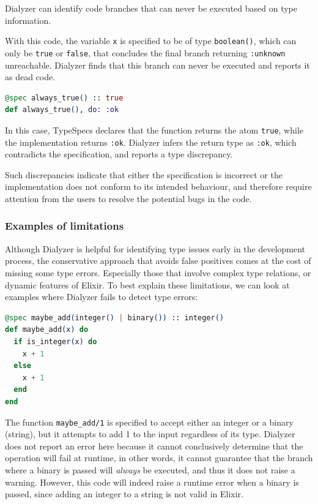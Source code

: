Dialyzer can identify code branches that can never be executed based on type information.

With this code, the variable \texttt{x} is specified to be of type \texttt{boolean()}, which can only be \texttt{true} or \texttt{false}, that concludes the final branch returning \texttt{:unknown} unreachable. 
Dialyzer finds that this branch can never be executed and reports it as dead code.

\begin{lstlisting}[language=Elixir, firstnumber=last]
@spec always_true() :: true
def always_true(), do: :ok
\end{lstlisting}

In this case, TypeSpecs declares that the function returns the atom \texttt{true}, while the implementation returns \texttt{:ok}. 
Dialyzer infers the return type as \texttt{:ok}, which contradicts the specification, and reports a type discrepancy.

Such discrepancies indicate that either the specification is incorrect or the implementation does not conform to its intended behaviour, and therefore require attention from the users to resolve the potential bugs in the code.

\subsubsection{Examples of limitations}

Although Dialyzer is helpful for identifying type issues early in the development process, the conservative approach that avoids false positives comes at the cost of missing some type errors.
Especially those that involve complex type relations, or dynamic features of Elixir.
To best explain these limitations, we can look at examples where Dialyzer fails to detect type errors:

\begin{lstlisting}[language=Elixir, firstnumber=last]
@spec maybe_add(integer() | binary()) :: integer()
def maybe_add(x) do
  if is_integer(x) do
    x + 1
  else
    x + 1
  end
end
\end{lstlisting}

The function \texttt{maybe\_add/1} is specified to accept either an integer or a binary (string), but it attempts to add 1 to the input regardless of its type.
Dialyzer does not report an error here because it cannot conclusively determine that the operation will fail at runtime, in other words, it cannot guarantee that the branch where a binary is passed will \textit{always} be executed, and thus it does not raise a warning.
However, this code will indeed raise a runtime error when a binary is passed, since adding an integer to a string is not valid in Elixir.

